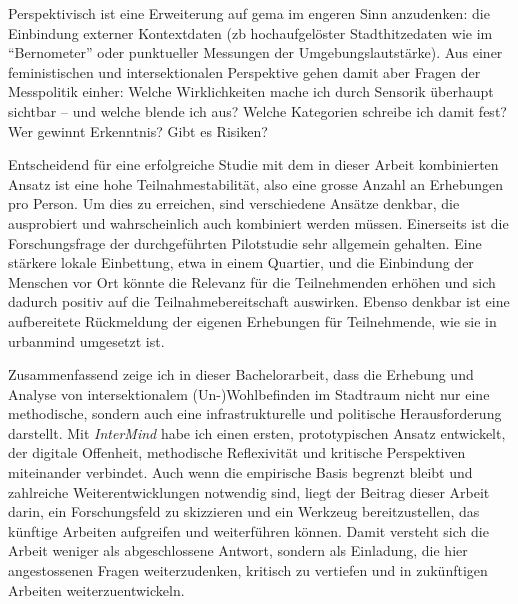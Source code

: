 Perspektivisch ist eine Erweiterung auf \gls{gema} im engeren Sinn anzudenken: die Einbindung externer Kontextdaten (\gls{zb} hochaufgelöster Stadthitzedaten wie im \enquote{Bernometer} \parencite[siehe][]{burgerModellingSpatialPattern2021} oder punktueller Messungen der Umgebungslautstärke). Aus einer feministischen und intersektionalen Perspektive gehen damit aber Fragen der Messpolitik einher: Welche Wirklichkeiten mache ich durch Sensorik überhaupt sichtbar -- und welche blende ich aus? Welche Kategorien schreibe ich damit fest? Wer gewinnt Erkenntnis? Gibt es Risiken?

Entscheidend für eine erfolgreiche Studie mit dem in dieser Arbeit kombinierten Ansatz ist eine hohe Teilnahmestabilität, also eine grosse Anzahl an Erhebungen pro Person. Um dies zu erreichen, sind verschiedene Ansätze denkbar, die ausprobiert und wahrscheinlich auch kombiniert werden müssen. Einerseits ist die Forschungsfrage der durchgeführten Pilotstudie sehr allgemein gehalten. Eine stärkere lokale Einbettung, etwa in einem Quartier, und die Einbindung der Menschen vor Ort könnte die Relevanz für die Teilnehmenden erhöhen und sich dadurch positiv auf die Teilnahmebereitschaft auswirken. Ebenso denkbar ist eine aufbereitete Rückmeldung der eigenen Erhebungen für Teilnehmende, wie sie in \gls{urbanmind} umgesetzt ist.

Zusammenfassend zeige ich in dieser Bachelorarbeit, dass die Erhebung und Analyse von intersektionalem (Un-)Wohlbefinden im Stadtraum nicht nur eine methodische, sondern auch eine infrastrukturelle und politische Herausforderung darstellt. Mit \textit{InterMind} habe ich einen ersten, prototypischen Ansatz entwickelt, der digitale Offenheit, methodische Reflexivität und kritische Perspektiven miteinander verbindet. Auch wenn die empirische Basis begrenzt bleibt und zahlreiche Weiterentwicklungen notwendig sind, liegt der Beitrag dieser Arbeit darin, ein Forschungsfeld zu skizzieren und ein Werkzeug bereitzustellen, das künftige Arbeiten aufgreifen und weiterführen können. Damit versteht sich die Arbeit weniger als abgeschlossene Antwort, sondern als Einladung, die hier angestossenen Fragen weiterzudenken, kritisch zu vertiefen und in zukünftigen Arbeiten weiterzuentwickeln.




